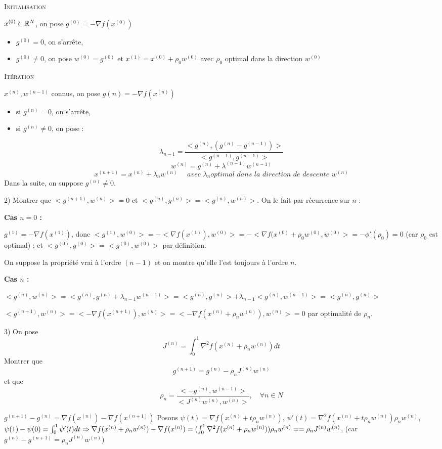 \textsc{Initialisation}

$x^{(0)}\in\mathbb{R}^N$, on pose $g^{(0)}=-\nabla f(x^{(0)})$
\begin{itemize}
\item $g^{(0)}=0$, on s'arrête,
\item $g^{(0)}\ne0$, on pose $w^{(0)}=g^{(0)}$ et $x^{(1)}=x^{(0)}+\rho_0w^{(0)}$ avec $\rho_0$ optimal dans la direction $w^{(0)}$
\end{itemize}

\textsc{Itération}

$x^{(n)}, w^{(n-1)}$ connus, on pose $g(n)=-\nabla f(x^{(n)})$
\begin{itemize}
\item si $g^{(n)}=0$, on s'arrête,
\item si $g^{(n)}\ne0$, on pose :
\end{itemize}
\[ \lambda_{n-1} = \frac{ <g^{(n)},(g^{(n)}-g^{(n-1)})> }{ <g^{(n-1)},g^{(n-1)}> }\]
\[ w^{(n)}=g^{(n)}+\lambda^{(n-1)}w^{(n-1)} \]
\[ x^{(n+1)}=x^{(n)}+\lambda_nw^{(n)} \quad \textit{ avec } \lambda_n \textit{optimal dans la direction de descente }w^{(n)} \]
Dans la suite, on suppose $g^{(n)}\ne0$.

2) Montrer que $<g^{(n+1)},w^{(n)}>=0$ et $<g^{(n)},g^{(n)}>=<g^{(n)},w^{(n)}>$.
On le fait par récurrence sur $n$ :

\textbf{Cas $n=0$ :}

$g^{(1)}=-\nabla f(x^{(1)})$, donc $<g^{(1)},w^{(0)}>=-<\nabla f(x^{(1)}),w^{(0)}>=-<\nabla f(x^{(0)}+\rho_0w^{(0)},w^{(0)}>=-\phi'(\rho_0)=0$ (car $\rho_0$ est optimal) ; et $<g^{(0)},g^{(0)}>=<g^{(0)},w^{(0)}>$ par définition.

On suppose la propriété vrai à l'ordre $(n-1)$ et on montre qu'elle l'est toujours à l'ordre $n$.

\textbf{Cas $n$ :}

$<g^{(n)},w^{(n)}>=<g^{(n)},g^{(n)}+\lambda_{n-1}w^{(n-1)}>=<g^{(n)},g^{(n)}>+\lambda_{n-1}<g^{(n)},w^{(n-1)}>=<g^{(n)},g^{(n)}>$ 

$<g^{(n+1)},w^{(n)}>=<-\nabla f(x^{(n+1)}),w^{(n)}>=<-\nabla f(x^{(n)}+\rho_nw^{(n)}),w^{(n)}>=0$ par optimalité de $\rho_n$.

3) On pose \[ J^{(n)}=\int_0^1 \nabla^2 f(x^{(n)}+\rho_nw^{(n)})dt \]
Montrer que \[ g^{(n+1)}=g^{(n)}-\rho_nJ^{(n)}w^{(n)} \] et que \[ \rho_n = \frac{ <-g^{(n)},w^{(n-1)}> }{ <J^{(n)}w^{(n)},w^{(n)}>},\quad \forall n\in N \]

$g^{(n+1)}-g^{(n)}=\nabla f(x^{(n)})-\nabla f(x^{(n+1)})$
Posons $\psi(t)=\nabla f(x^{(n)}+t\rho_nw^{(n)})$, $\psi'(t)=\nabla^2 f(x^{(n)}+t\rho_nw^{(n)})\rho_nw^{(n)}$, $\psi(1)-\psi(0)=\int_0^1 \psi'(t)dt \Rightarrow \nabla f(x^{(n)}+\rho_nw^{(n)})-\nabla f(x^{(n)})=(\int_0^1\nabla^2 f(x^{(n)}+\rho_nw^{(n)}))\rho_nw^{(n)}==\rho_nJ^{(n)}w^{(n)}$, (car $g^{(n)}-g^{(n+1)}=\rho_nJ^{(n)}w^{(n)}$)

